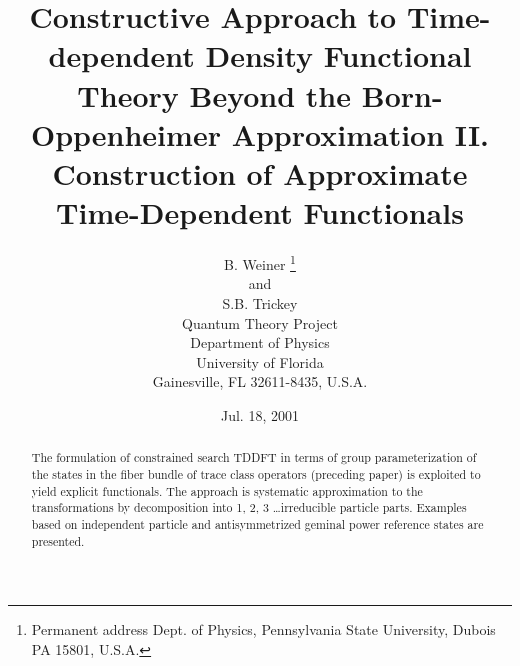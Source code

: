 




\epsfverbosetrue 
\newcommand{\be}{\begin{equation}}
\newcommand{\ee}{\end{equation}}
\newcommand{\bea}{\begin{eqnarray}}
\newcommand{\eea}{\end{eqnarray}}
\newcommand{\ba}{\begin{array}}
\newcommand{\ea}{\end{array}}
\newcommand{\half}{1/2}
\newcommand{\pprime}{\prime \prime}
\newcommand{\ppprime}{\prime \prime \prime}
\def\rank{\mathop{\rm rank}\nolimits}



\title{Constructive Approach to Time-dependent Density Functional Theory
Beyond the Born-Oppenheimer Approximation II. Construction of Approximate
Time-Dependent Functionals}
\author{B. Weiner \thanks{%
Permanent address Dept. of Physics, Pennsylvania State University, Dubois PA
15801, U.S.A.} \\
and \\
S.B. Trickey \\
Quantum Theory Project \\
Department of Physics \\
University of Florida \\
Gainesville, FL 32611-8435, U.S.A.}
\date{Jul. 18, 2001}
\maketitle

\begin{abstract}
The formulation of constrained search TDDFT in terms of group
parameterization of the states in the fiber bundle of trace class operators
(preceding paper) is exploited to yield explicit functionals. The approach
is systematic approximation to the transformations by decomposition into 1,
2, 3 \ldots irreducible particle parts. Examples based on independent
particle and antisymmetrized geminal power reference states are presented.
\end{abstract}

